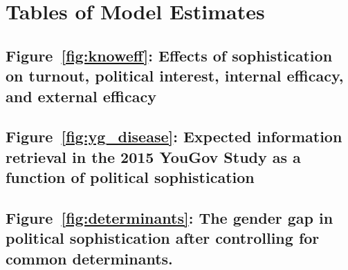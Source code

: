 \clearpage
\section{Tables of Model Estimates}\label{app:tables}

\subsection{Figure~\ref{fig:knoweff}: Effects of sophistication on turnout, political interest, internal efficacy, and external efficacy}




\clearpage

\subsection{Figure~\ref{fig:yg_disease}: Expected information retrieval in the 2015 YouGov Study as a function of political sophistication}

\clearpage

\subsection{Figure~\ref{fig:determinants}: The gender gap in political sophistication after controlling for common determinants.}



